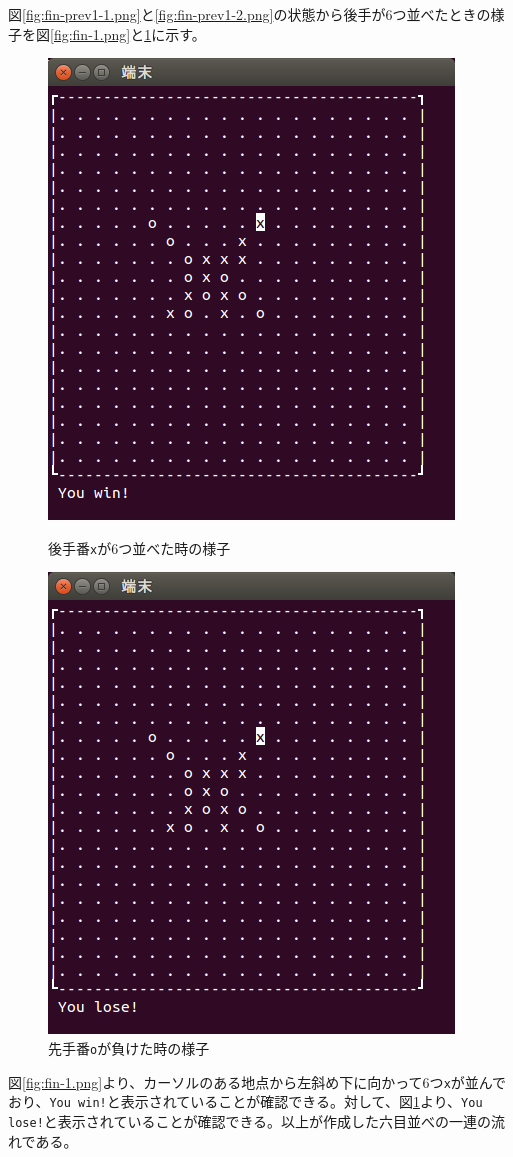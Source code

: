 \documentclass[a4j, titlepage, 10pt]{jsarticle}
\newcommand{\code}[1]{\texttt{#1}}
\begin{document}
図\ref{fig:fin-prev1-1.png}と\ref{fig:fin-prev1-2.png}の状態から後手が6つ並べたときの様子を図\ref{fig:fin-1.png}と\ref{fig:fin-2.png}に示す。
\begin{figure}[H]
  \begin{minipage}{0.5\hsize}
    \centering
    \includegraphics[scale=0.5]{img/fin-1.png}
    \caption{後手番\code{x}が6つ並べた時の様子}
    \label{fig:fin-1.png}
  \end{minipage}
  \begin{minipage}{0.5\hsize}
    \includegraphics[scale=0.5]{img/fin-2.png}
    \caption{先手番\code{o}が負けた時の様子}
    \label{fig:fin-2.png}
  \end{minipage}
\end{figure}
図\ref{fig:fin-1.png}より、カーソルのある地点から左斜め下に向かって6つ\texttt{x}が並んでおり、\texttt{You win!}と表示されていることが確認できる。対して、図\ref{fig:fin-2.png}より、\texttt{You lose!}と表示されていることが確認できる。以上が作成した六目並べの一連の流れである。
\end{document}
